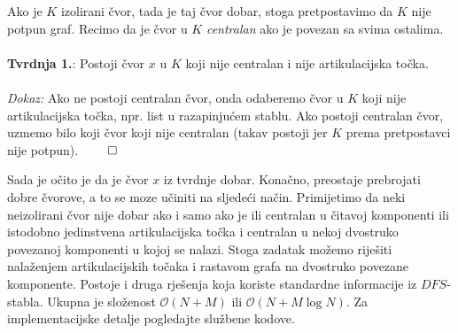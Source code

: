 Ako je $K$ izolirani čvor, tada je taj čvor dobar, stoga pretpostavimo da $K$ nije potpun graf. Recimo da je čvor u $K$ \textit{centralan} ako je povezan sa svima ostalima.
\\\\
\textbf{Tvrdnja 1.}: Postoji čvor $x$ u $K$ koji nije centralan i nije artikulacijska točka.
\\\\
\textit{Dokaz:} Ako ne postoji centralan čvor, onda odaberemo čvor u $K$ koji nije artikulacijska točka, npr. list u razapinjućem stablu. Ako postoji centralan čvor, uzmemo bilo koji čvor koji nije centralan (takav postoji jer $K$ prema pretpostavci nije potpun). $\qed$

Sada je očito je da je čvor $x$ iz tvrdnje dobar. Konačno, preostaje prebrojati dobre čvorove, a to se moze učiniti na sljedeći način. \iffalse Promotrimo tzv. \textit{block-cut tree} $T$ neke komponente (koja bez smanjenja općenitosti nije izolirani čvor), odnosno stablo čiji vrhovi odgovaraju artikulacijskim točkama i dvostruko povezanim komponentama, pri čemu je neka artikulacijska točka povezana s nekom dvostruko povezanom komponentom ako se nalazi u njoj. \fi Primijetimo da neki neizolirani čvor nije dobar ako i samo ako je ili centralan u čitavoj komponenti ili istodobno jedinstvena artikulacijska točka i centralan u nekoj dvostruko povezanoj komponenti u kojoj se nalazi. Stoga zadatak možemo riješiti nalaženjem artikulacijskih točaka i rastavom grafa na dvostruko povezane komponente. Postoje i druga rješenja koja koriste standardne informacije iz $DFS$-stabla. Ukupna je složenost $\mathcal{O}(N + M)$ ili $\mathcal{O}(N + M\log N)$. Za implementacijske detalje pogledajte službene kodove.
